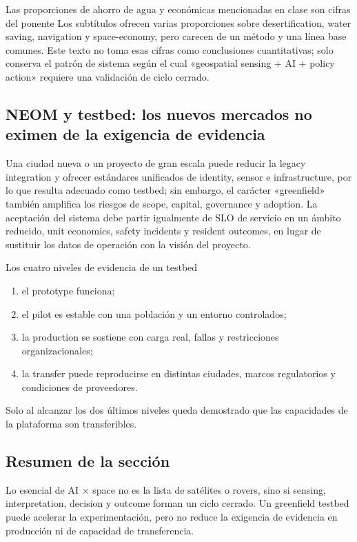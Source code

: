 \begin{warningbox}{Las proporciones de ahorro de agua y económicas mencionadas en clase son cifras del ponente}
Los subtítulos ofrecen varias proporciones sobre desertification, water saving, navigation y space-economy, pero carecen de un método y una línea base comunes. Este texto no toma esas cifras como conclusiones cuantitativas; solo conserva el patrón de sistema según el cual «geospatial sensing + AI + policy action» requiere una validación de ciclo cerrado.
\end{warningbox}

\subsection{NEOM y testbed: los nuevos mercados no eximen de la exigencia de evidencia}

Una ciudad nueva o un proyecto de gran escala puede reducir la legacy integration y ofrecer estándares unificados de identity, sensor e infrastructure, por lo que resulta adecuado como testbed; sin embargo, el carácter «greenfield» también amplifica los riesgos de scope, capital, governance y adoption. La aceptación del sistema debe partir igualmente de SLO de servicio en un ámbito reducido, unit economics, safety incidents y resident outcomes, en lugar de sustituir los datos de operación con la visión del proyecto.

\begin{importantbox}{Los cuatro niveles de evidencia de un testbed}
\begin{enumerate}
  \item el prototype funciona;
  \item el pilot es estable con una población y un entorno controlados;
  \item la production se sostiene con carga real, fallas y restricciones organizacionales;
  \item la transfer puede reproducirse en distintas ciudades, marcos regulatorios y condiciones de proveedores.
\end{enumerate}
Solo al alcanzar los dos últimos niveles queda demostrado que las capacidades de la plataforma son transferibles.
\end{importantbox}

\subsection{Resumen de la sección}

Lo esencial de AI × space no es la lista de satélites o rovers, sino si sensing, interpretation, decision y outcome forman un ciclo cerrado. Un greenfield testbed puede acelerar la experimentación, pero no reduce la exigencia de evidencia en producción ni de capacidad de transferencia.
